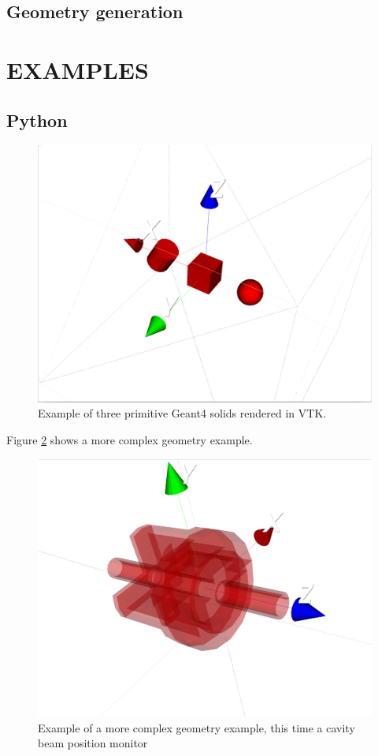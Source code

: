 \documentclass[a4paper,
               keeplastbox,   %
               ]{jacow}
\begin{document}
\subsection{Geometry generation}

\section{EXAMPLES}
\subsection{Python}


\begin{figure}[!htb]
   \centering
   \includegraphics*[width=.9\columnwidth]{./examples/simple.jpg}
   \caption{Example of three primitive Geant4 solids rendered in VTK.}
   \label{fig:simple}
\end{figure}

Figure \ref{fig:dipole} shows a more complex geometry example. 
\begin{figure}[!htb]
   \centering
   \includegraphics*[width=.9\columnwidth]{./examples/dipole.jpg}
   \caption{Example of a more complex geometry example, this time a cavity beam position monitor}
   \label{fig:dipole}
\end{figure}
\end{document}
